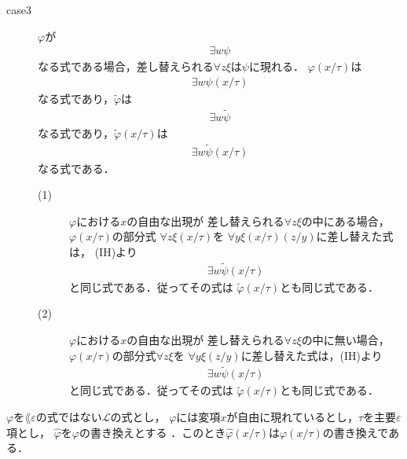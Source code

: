\begin{metaprf}
\begin{description}
\begin{description}
					\item[case3] $\varphi$が
						\begin{align}
							\exists w \psi
						\end{align}
						なる式である場合，差し替えられる$\forall z \xi$は$\psi$に現れる．
						$\varphi(x/\tau)$は
						\begin{align}
							\exists w \psi(x/\tau)
						\end{align}
						なる式であり，$\widetilde{\varphi}$は
						\begin{align}
							\exists w \widetilde{\psi}
						\end{align}
						なる式であり，$\widetilde{\varphi}(x/\tau)$は
						\begin{align}
							\exists w \widetilde{\psi}(x/\tau)
						\end{align}
						なる式である．
						\begin{description}
							\item[(1)] $\varphi$における$x$の自由な出現が
								差し替えられる$\forall z \xi$の中にある場合，
								$\varphi(x/\tau)$の部分式
								$\forall z \xi(x/\tau)$を
								$\forall y \xi(x/\tau)(z/y)$に差し替えた式は，
								(IH)より
								\begin{align}
									\exists w \widetilde{\psi}(x/\tau)
								\end{align}
								と同じ式である．従ってその式は
								$\widetilde{\varphi}(x/\tau)$とも同じ式である．
								
							\item[(2)] $\varphi$における$x$の自由な出現が
								差し替えられる$\forall z \xi$の中に無い場合，
								$\varphi(x/\tau)$の部分式$\forall z \xi$を
								$\forall y \xi(z/y)$に差し替えた式は，(IH)より
								\begin{align}
									\exists w \widetilde{\psi}(x/\tau)
								\end{align}
								と同じ式である．従ってその式は
								$\widetilde{\varphi}(x/\tau)$とも同じ式である．
								\QED
						\end{description}
				\end{description}
		\end{description}
	\end{metaprf}
	
	
	\begin{screen}
		\begin{metathm}[書き換えへの代入は代入した式の書き換え]
		\label{metathm:substitution_to_rewritten_formula}
			$\varphi$を$\lang{\varepsilon}$の式ではない$\mathcal{L}$の式とし，
			$\varphi$には変項$x$が自由に現れているとし，$\tau$を主要$\varepsilon$項とし，
			$\widehat{\varphi}$を$\varphi$の書き換えとする\footnotemark
			．このとき$\widehat{\varphi}(x/\tau)$は$\varphi(x/\tau)$の書き換えである．
		\end{metathm}
	\end{screen}
	
